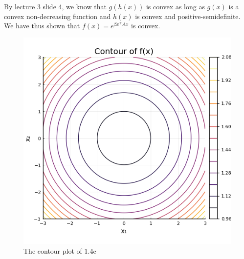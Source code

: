 \documentclass{article}
\begin{document}
	By lecture 3 slide 4, we know that $g(h(x))$ is convex as long as $g(x)$ is a convex non-decreasing function and $h(x)$ is convex and positive-semidefinite. We have thus shown that $f(x) = e^{\beta x^\top A x}$ is convex.

\begin{figure}[H]
	\centering
	\includegraphics{plots/1_4c_contour.png}
	\caption{The contour plot of 1.4c}
	\label{fig:1.4c}
\end{figure}
\end{document}
